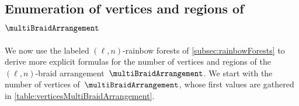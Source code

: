 \documentclass{amsart}
\theoremstyle{definition}
\begin{document}

\subsection{Enumeration of vertices and regions of $\multiBraidArrangement$}
\label{subsec:verticesFacetsMultiBraidArrangement}

We now use the labeled $(\ell,n)$-rainbow forests of \cref{subsec:rainbowForests} to derive more explicit formulas for the number of vertices and regions of the $(\ell,n)$-braid arrangement~$\multiBraidArrangement$.
We start with the number of vertices of~$\multiBraidArrangement$, whose first values are gathered in \cref{table:verticesMultiBraidArrangement}.

\begin{table}
	\centerline{}
	\vspace{.3cm}
	\caption{The numbers $f_0(\multiBraidArrangement) = \ell \big( (\ell-1) n + 1 \big)^{n-2}$ of vertices of~$\multiBraidArrangement$ for~$\ell,n \in [8]$.}
	\label{table:verticesMultiBraidArrangement}
\end{table}
\end{document}
